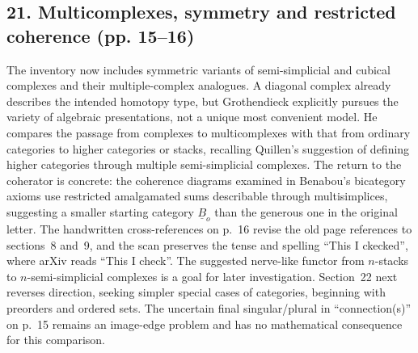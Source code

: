 \documentclass[10pt,oneside]{book}
\begin{document}
\subsection*{21. Multicomplexes, symmetry and restricted coherence (pp. 15--16)}
The inventory now includes symmetric variants of semi-simplicial and cubical complexes and their multiple-complex analogues. A diagonal complex already describes the intended homotopy type, but Grothendieck explicitly pursues the variety of algebraic presentations, not a unique most convenient model. He compares the passage from complexes to multicomplexes with that from ordinary categories to higher categories or stacks, recalling Quillen's suggestion of defining higher categories through multiple semi-simplicial complexes. The return to the coherator is concrete: the coherence diagrams examined in Benabou's bicategory axioms use restricted amalgamated sums describable through multisimplices, suggesting a smaller starting category $\underline B_o$ than the generous one in the original letter. The handwritten cross-references on p.~16 revise the old page references to sections~8 and~9, and the scan preserves the tense and spelling ``This I ckecked'', where arXiv reads ``This I check''. The suggested nerve-like functor from $n$-stacks to $n$-semi-simplicial complexes is a goal for later investigation. Section~22 next reverses direction, seeking simpler special cases of categories, beginning with preorders and ordered sets. The uncertain final singular/plural in ``connection(s)'' on p.~15 remains an image-edge problem and has no mathematical consequence for this comparison.
\end{document}
